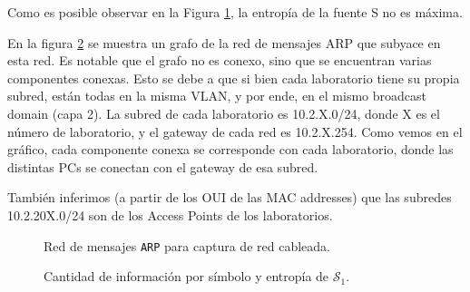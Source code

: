 Como es posible observar en la Figura \ref{res:esc1:fig1}, la entropía de la fuente S no es máxima.


\begin{figure}[h]
    \label{res:esc1:fig1}
\end{figure}

En la figura \ref{res:esc1:fig2} se muestra un grafo de la red de mensajes ARP que subyace en esta red. Es notable que el grafo no es conexo, sino que se encuentran varias componentes conexas. Esto se debe a que si bien cada laboratorio tiene su propia subred, están todas en la misma VLAN, y por ende, en el mismo broadcast domain (capa 2). La subred de cada laboratorio es 10.2.X.0/24, donde X es el número de laboratorio, y el gateway de cada red es 10.2.X.254. Como vemos en el gráfico, cada componente conexa se corresponde con cada laboratorio, donde las distintas PCs se conectan con el gateway de esa subred.

También inferimos (a partir de los OUI de las MAC addresses) que las subredes 10.2.20X.0/24 son de los Access Points de los laboratorios.



\begin{figure}[H]
    \caption{Red de mensajes \texttt{ARP} para captura de red cableada.}
    \label{res:esc1:fig2}
\end{figure}


\begin{figure}[h]
	\caption{Cantidad de información por símbolo y entropía de $\mathcal{S}_1$.}
    \label{res:esc1:fig3}
\end{figure}




